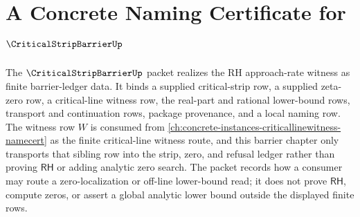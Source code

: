 \chapter{A Concrete Naming Certificate for $\CriticalStripBarrierUp$}
\label{ch:concrete-instances-criticalstripbarrier-namecert}

The $\CriticalStripBarrierUp$ packet realizes the RH approach-rate witness as finite barrier-ledger data. It binds a supplied critical-strip row, a supplied zeta-zero row, a critical-line witness row, the real-part and rational lower-bound rows, transport and continuation rows, package provenance, and a local naming row. The witness row $W$ is consumed from \autoref{ch:concrete-instances-criticallinewitness-namecert} as the finite critical-line witness route, and this barrier chapter only transports that sibling row into the strip, zero, and refusal ledger rather than proving $\mathsf{RH}$ or adding analytic zero search. The packet records how a consumer may route a zero-localization or off-line lower-bound read; it does not prove $\mathsf{RH}$, compute zeros, or assert a global analytic lower bound outside the displayed finite rows.

